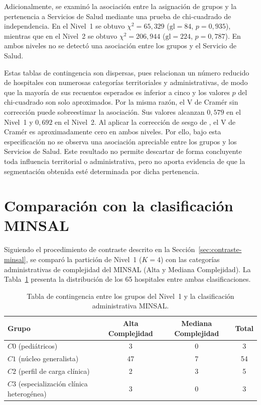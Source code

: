 Adicionalmente, se examinó la asociación entre la asignación de grupos y la pertenencia a Servicios de Salud mediante una prueba de chi-cuadrado de independencia. En el Nivel~1 se obtuvo $\chi^2=65{,}329$ ($\text{gl}=84$, $p=0{,}935$), mientras que en el Nivel~2 se obtuvo $\chi^2=206{,}944$ ($\text{gl}=224$, $p=0{,}787$). En ambos niveles no se detectó una asociación entre los grupos y el Servicio de Salud.

Estas tablas de contingencia son dispersas, pues relacionan un número reducido de hospitales con numerosas categorías territoriales y administrativas, de modo que la mayoría de sus recuentos esperados es inferior a cinco y los valores $p$ del chi-cuadrado son solo aproximados. Por la misma razón, el V de Cramér sin corrección puede sobreestimar la
asociación. Sus valores alcanzan $0{,}579$ en el Nivel~1 y $0{,}692$
en el Nivel~2. Al aplicar la corrección de sesgo de \citet{Bergsma2013}, el V de Cramér es aproximadamente cero en ambos niveles. Por ello, bajo esta especificación no se observa una asociación apreciable entre los grupos y los Servicios de Salud. Este resultado no permite descartar de forma concluyente toda influencia territorial o administrativa, pero no aporta evidencia de que la segmentación obtenida esté determinada por dicha pertenencia.

\section{Comparación con la clasificación MINSAL}
\label{sec:res-minsal}

Siguiendo el procedimiento de contraste descrito en la
Sección~\ref{sec:contraste-minsal}, se comparó la partición de Nivel~1
($K=4$) con las categorías administrativas de complejidad del MINSAL
(Alta y Mediana Complejidad). La Tabla~\ref{tab:contingencia-minsal}
presenta la distribución de los 65 hospitales entre ambas clasificaciones.

\begin{table}[htbp]
\centering
\caption{Tabla de contingencia entre los grupos del Nivel~1 y la clasificación administrativa MINSAL.}
\label{tab:contingencia-minsal}
\begin{tabular}{l c c c}
\toprule
\textbf{Grupo} & \textbf{Alta Complejidad} &
\textbf{Mediana Complejidad} & \textbf{Total} \\
\midrule
$C0$ (pediátricos) & 3 & 0 & 3 \\
$C1$ (núcleo generalista) & 47 & 7 & 54 \\
$C2$ (perfil de carga clínica) & 2 & 3 & 5 \\
$C3$ (especialización clínica heterogénea) & 3 & 0 & 3 \\
\bottomrule
\end{tabular}
\end{table}

